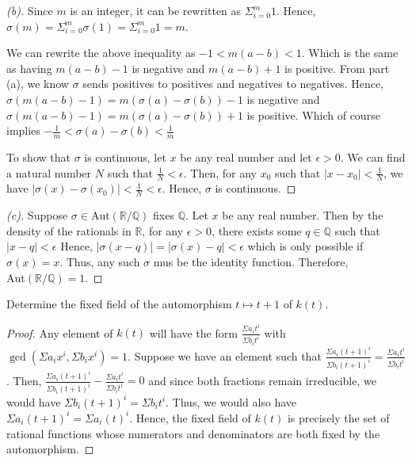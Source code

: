 \documentclass[10pt]{article}
\newcommand{\Q}{\mathbb{Q}}
\newcommand{\R}{\mathbb{R}}
\newenvironment{problem}[2][Problem]{\begin{trivlist}
		\item[\hskip \labelsep {\bfseries #1}\hskip \labelsep {\bfseries #2.}]}{\end{trivlist}}
\begin{document}
\begin{problem}{1.7}
\begin{proof}[(b)]
			Since $m$ is an integer, it can be rewritten as $\Sigma_{i=0}^m 1$. Hence, $\sigma(m) = \Sigma_{i=0}^m \sigma(1) = \Sigma_{i=0}^m 1 = m$.
			
			We can rewrite the above inequality as $-1 < m(a-b) < 1$. Which is the same as having $m(a-b) - 1$ is negative and $m(a-b) + 1$ is positive. From part (a), we know $\sigma$ sends positives to positives and negatives to negatives. Hence, $\sigma(m(a-b) - 1) = m(\sigma(a) - \sigma(b)) - 1$ is negative and $\sigma(m(a-b) - 1) = m(\sigma(a) - \sigma(b)) + 1$ is positive. Which of course implies $-\frac{1}{m} < \sigma(a) - \sigma(b) < \frac{1}{m}$
			
			To show that $\sigma$ is continuous, let $x$ be any real number and let $\epsilon > 0$. We can find a natural number $N$ such that $\frac{1}{N} < \epsilon$. Then, for any $x_0$ such that $|x-x_0| < \frac{1}{N}$, we have $|\sigma(x) - \sigma(x_0)| < \frac{1}{N} < \epsilon$. Hence, $\sigma$ is continuous.
		\end{proof}
		\begin{proof}[(c)]
			Suppose $\sigma \in \text{Aut}(\R/\Q)$ fixes $\Q$. Let $x$ be any real number. Then by the density of the rationals in $\R$, for any $\epsilon > 0$, there exists some $q \in \Q$ such that $|x-q| < \epsilon$ Hence, $|\sigma(x-q)| = |\sigma(x)-q| < \epsilon$ which is only possible if $\sigma(x) = x$. Thus, any such $\sigma$ mus be the identity function. Therefore, $\text{Aut}(\R/\Q)=1$.
		\end{proof}
	\end{problem}
	
	\begin{problem}{1.9}
		Determine the fixed field of the automorphism $t \mapsto t + 1$ of $k(t)$.
		\begin{proof}
			Any element of $k(t)$ will have the form $\frac{\Sigma a_i t^i}{\Sigma b_i t^i}$ with $\gcd(\Sigma a_i x^i, \Sigma b_i x^i) = 1$. 
			Suppose we have an element such that $\frac{\Sigma a_i (t+1)^i}{\Sigma b_i (t+1)^i} = \frac{\Sigma a_i t^i}{\Sigma b_i t^i}$. Then, $\frac{\Sigma a_i (t+1)^i}{\Sigma b_i (t+1)^i} - \frac{\Sigma a_i t^i}{\Sigma b_i t^i} = 0$ and since both fractions remain irreducible, we would have $\Sigma b_i (t+1)^i = \Sigma b_i t^i$. Thus, we would also have $\Sigma a_i (t+1)^i = \Sigma a_i (t)^i$. Hence, the fixed field of $k(t)$ is precisely the set of rational functions whose numerators and denominators are both fixed by the automorphism.
		\end{proof}
	\end{problem}
\end{document}
